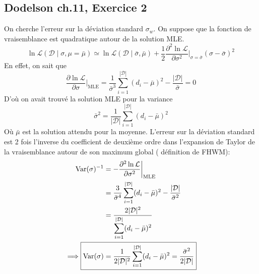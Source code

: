 \documentclass{article}
\numberwithin{equation}{section}
\begin{document}
\subsection{Dodelson ch.11, Exercice 2}
On cherche l'erreur sur la déviation standard $\sigma_w$. On suppose que la 
fonction de vraisemblance est quadratique autour de la solution MLE. 
\[
        \ln \mathcal{L}(\mathcal{\mathcal{D}} \mid \sigma, \mu = \bar{\mu}) \simeq 
        \ln \mathcal{L}(\mathcal{D} \mid \bar{\sigma}, \bar{\mu}) 
        + \frac{1}{2}\frac{\partial^2 \ln \mathcal{L}}{\partial \sigma^2} 
        \bigg|_{\sigma=\bar{\sigma}} (\sigma - \bar{\sigma})^{2}
\]
En effet, on sait que
\[
        \frac{\partial \ln \mathcal{L}}{\partial \sigma}\bigg|_{\text{MLE}} = 
        \frac{1}{\bar{\sigma}^{3}}\sum_{i=1}^{|\mathcal{D}|}(d_i - \bar{\mu})^{2} - 
        \frac{|\mathcal{D}|}{\bar{\sigma}} = 0
\]
D'où on avait trouvé la solution MLE pour la variance
\[
        \bar{\sigma}^2 = 
        \frac{1}{|\mathcal{D}|}\sum_{i=1}^{|\mathcal{D}|}(d_i - \bar{\mu})^{2}
\]
Où $\bar{\mu}$ est la solution attendu pour la moyenne. L'erreur 
sur la déviation standard est 2 fois l'inverse du 
coefficient de deuxième ordre dans 
l'expansion de Taylor de la vraisemblance autour de son maximum global (
définition de FHWM):
\begingroup
\allowdisplaybreaks
\begin{align*}
        \text{Var}(\sigma)^{-1} &= -\frac{\partial^2 \ln \mathcal{L}}{\partial \sigma^2}
        \bigg|_{\text{MLE}} \\
                          &= \frac{3}{\bar{\sigma}^4}\sum_{i=1}^{|\mathcal{D}|}
        (d_i - \bar{\mu})^{2} - \frac{|\mathcal{D}|}{\bar{\sigma}^{2}} \\
                          &= \frac{2|\mathcal{D}|^2}{
                          \displaystyle \sum_{i=1}^{|\mathcal{D}|}(d_i - \bar{\mu})^{2}} \\
        \implies \Aboxed{  \text{Var}(\sigma)  &= \frac{1}{2|\mathcal{D}|^{2}}
        \sum_{i = 1}^{|\mathcal{D}|}(d_i -\bar{\mu})^{2} = \frac{\bar{\sigma}^2}{2|\mathcal{D}|}}
\end{align*}
\endgroup
\end{document}

